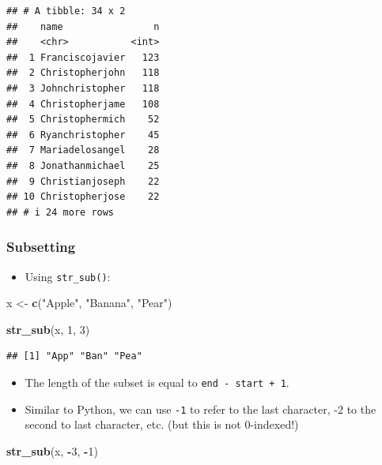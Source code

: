 \documentclass[
]{article}
\newenvironment{Shaded}{\begin{snugshade}}{\end{snugshade}}
\newcommand{\DecValTok}[1]{\textcolor[rgb]{0.00,0.00,0.81}{#1}}
\newcommand{\FunctionTok}[1]{\textcolor[rgb]{0.13,0.29,0.53}{\textbf{#1}}}
\newcommand{\NormalTok}[1]{#1}
\newcommand{\OtherTok}[1]{\textcolor[rgb]{0.56,0.35,0.01}{#1}}
\newcommand{\SpecialCharTok}[1]{\textcolor[rgb]{0.81,0.36,0.00}{\textbf{#1}}}
\newcommand{\StringTok}[1]{\textcolor[rgb]{0.31,0.60,0.02}{#1}}
\providecommand{\tightlist}{%
  \setlength{\itemsep}{0pt}\setlength{\parskip}{0pt}}
\begin{document}
\begin{verbatim}
## # A tibble: 34 x 2
##    name                n
##    <chr>           <int>
##  1 Franciscojavier   123
##  2 Christopherjohn   118
##  3 Johnchristopher   118
##  4 Christopherjame   108
##  5 Christophermich    52
##  6 Ryanchristopher    45
##  7 Mariadelosangel    28
##  8 Jonathanmichael    25
##  9 Christianjoseph    22
## 10 Christopherjose    22
## # i 24 more rows
\end{verbatim}

\subsubsection{Subsetting}\label{subsetting}

\begin{itemize}
\tightlist
\item
  Using \texttt{str\_sub()}:
\end{itemize}

\begin{Shaded}
\begin{Highlighting}[]
\NormalTok{x }\OtherTok{\textless{}{-}} \FunctionTok{c}\NormalTok{(}\StringTok{"Apple"}\NormalTok{, }\StringTok{"Banana"}\NormalTok{, }\StringTok{"Pear"}\NormalTok{)}

\FunctionTok{str\_sub}\NormalTok{(x, }\DecValTok{1}\NormalTok{, }\DecValTok{3}\NormalTok{)}
\end{Highlighting}
\end{Shaded}

\begin{verbatim}
## [1] "App" "Ban" "Pea"
\end{verbatim}

\begin{itemize}
\item
  The length of the subset is equal to \texttt{end\ -\ start\ +\ 1}.
\item
  Similar to Python, we can use \texttt{-1} to refer to the last
  character, -2 to the second to last character, etc. (but this is not
  0-indexed!)
\end{itemize}

\begin{Shaded}
\begin{Highlighting}[]
\FunctionTok{str\_sub}\NormalTok{(x, }\SpecialCharTok{{-}}\DecValTok{3}\NormalTok{, }\SpecialCharTok{{-}}\DecValTok{1}\NormalTok{)}
\end{Highlighting}
\end{Shaded}
\end{document}
